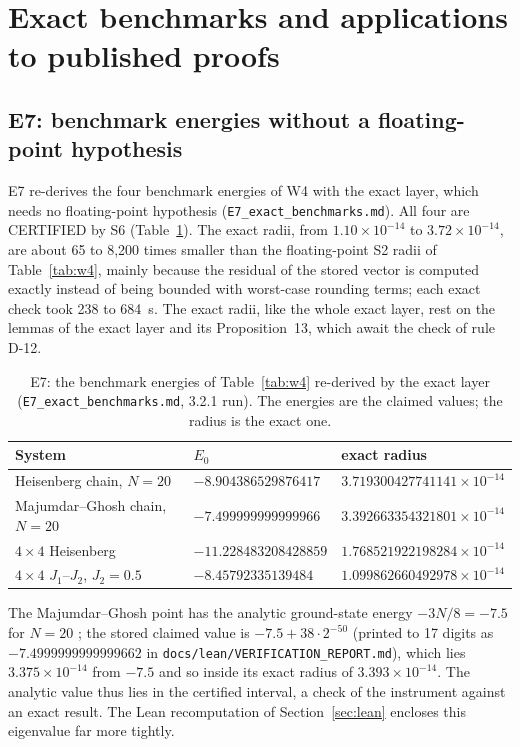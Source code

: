 \documentclass[11pt,a4paper]{article}
\newcommand{\code}[1]{\texttt{#1}}
\newcommand{\status}[1]{\textsf{#1}}
\newcommand{\CERT}{\status{CERTIFIED}}
\begin{document}
\section{Exact benchmarks and applications to published proofs}
\label{sec:apps}

\subsection{E7: benchmark energies without a floating-point hypothesis}

E7 re-derives the four benchmark energies of W4 with the exact layer, which needs no floating-point hypothesis
(\code{E7\_exact\_benchmarks.md}). All four are \CERT{} by S6 (Table~\ref{tab:e7}). The exact radii, from
$1.10\times10^{-14}$ to $3.72\times10^{-14}$, are about 65 to 8,200 times smaller than the floating-point S2 radii of
Table~\ref{tab:w4}, mainly because the residual of the stored vector is computed exactly instead of being bounded with
worst-case rounding terms; each exact check took 238 to 684~s. The exact radii, like the whole exact layer, rest on
the lemmas of the exact layer and its Proposition~13, which await the check of rule D-12.

\begin{table}[ht]
\centering\small
\caption{E7: the benchmark energies of Table~\ref{tab:w4} re-derived by the exact layer (\code{E7\_exact\_benchmarks.md},
3.2.1 run). The energies are the claimed values; the radius is the exact one.}
\label{tab:e7}
\begin{tabular}{@{}lll@{}}
\toprule
System & $E_0$ & exact radius \\
\midrule
Heisenberg chain, $N=20$ & $-8.904386529876417$ & $3.719300427741141\times10^{-14}$ \\
Majumdar--Ghosh chain, $N=20$ & $-7.499999999999966$ & $3.392663354321801\times10^{-14}$ \\
$4\times4$ Heisenberg & $-11.228483208428859$ & $1.768521922198284\times10^{-14}$ \\
$4\times4$ $J_1$--$J_2$, $J_2=0.5$ & $-8.45792335139484$ & $1.099862660492978\times10^{-14}$ \\
\bottomrule
\end{tabular}
\end{table}

The Majumdar--Ghosh point has the analytic ground-state energy $-3N/8=-7.5$ for $N=20$ \cite{MajumdarGhosh1969};
the stored claimed value is $-7.5+38\cdot2^{-50}$ (printed to 17 digits as $-7.4999999999999662$ in
\code{docs/lean/VERIFICATION\_REPORT.md}), which lies $3.375\times10^{-14}$ from $-7.5$ and so inside its exact radius
of $3.393\times10^{-14}$. The analytic value thus lies in the certified interval, a check of the instrument against an
exact result. The Lean recomputation of Section~\ref{sec:lean} encloses this eigenvalue far more tightly.
\end{document}
